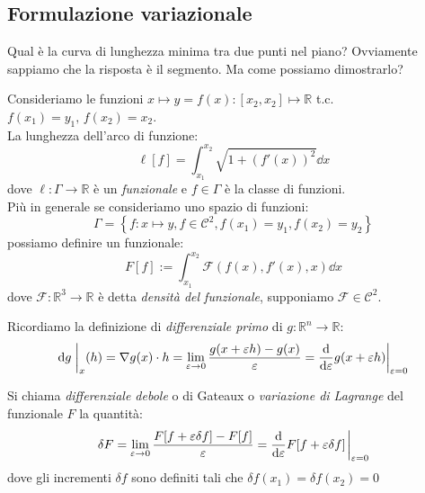 \subsection{Formulazione variazionale}
\begin{example}
    Qual è la curva di lunghezza minima tra due punti nel piano? Ovviamente sappiamo che la risposta è il segmento.
    Ma come possiamo dimostrarlo?
\end{example}
Consideriamo le funzioni $x\mapsto y= f(x):[x_2,x_2]\mapsto \mathbb{R}$ t.c. $f(x_1)=y_1, \,f(x_2)=x_2$.\\
La lunghezza dell'arco di funzione:
\begin{equation}
    \ell[f]=\int_{x_1}^{x_2}\sqrt{1+(f'(x))^2}\dd{x}            
\end{equation}
dove $\ell: \Gamma\rightarrow \mathbb{R}$ è un \textit{funzionale} e $f\in\Gamma$ è la classe di funzioni.\\
Più in generale se consideriamo uno spazio di funzioni:
\begin{equation}
    \Gamma= \left\{ f: x\mapsto y , f\in \mathcal{C}^2, f(x_1)=y_1, f(x_2)= y_2 \right\}
\end{equation}
possiamo definire un funzionale:
\begin{equation}
    F[f ]:= \int_{x_1}^{x_2}\mathcal{F}(f(x),f'(x),x)\dd{x}
\end{equation}
dove $\mathcal{F}:\mathbb{R}^3\rightarrow \mathbb{R}$ è detta \textit{densità del funzionale}, supponiamo $\mathcal{F}\in \mathcal{C}^2$.

\begin{remark}
    Ricordiamo la definizione di \textit{differenziale primo} di $g: \mathbb{R}^n \rightarrow \mathbb{R}$:
    \begin{equation}
        \dd{g}\eval_{x}(h) =\nabla g(x)\cdot h = \lim_{\varepsilon \to 0} \frac{g(x + \varepsilon h) - g(x)}{\varepsilon} 
        = \dv{\varepsilon} g(x + \varepsilon h)\bigg|_{\varepsilon = 0}
    \end{equation}
\end{remark}

\begin{definition}
    Si chiama \textit{differenziale debole} o di Gateaux o \textit{variazione di Lagrange} del funzionale $F $ la quantità:
    \begin{equation}
        \delta F = \lim_{\varepsilon\to 0}\frac{F[f+\varepsilon\delta f]-F[f]}{\varepsilon}= \dv{\varepsilon} F[f+\varepsilon\delta f ]\eval_{\varepsilon=0}
    \end{equation}
    dove gli incrementi $\delta f $ sono definiti tali che $\delta f(x_1)= \delta f(x_2)=0$
\end{definition}

